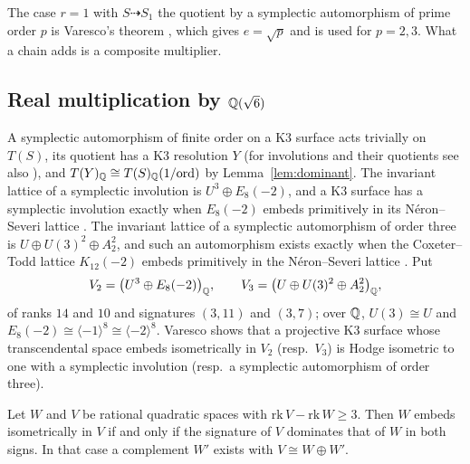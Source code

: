 The case $r=1$ with $S\dashrightarrow S_{1}$ the quotient by a symplectic automorphism of prime order $p$ is Varesco's theorem \cite[Thm.~2.1]{Var23}, which gives $e=\sqrt p$ and is used for $p=2,3$. What a chain adds is a composite multiplier.

\subsection{Real multiplication by \texorpdfstring{$\mathbb{Q}(\sqrt6)$}{Q(sqrt 6)}}

A symplectic automorphism of finite order on a K3 surface acts trivially on $T(S)$, its quotient has a K3 resolution $Y$ \cite{Nik80b} (for involutions and their quotients see also \cite{BN26}), and $T(Y)_{\mathbb{Q}}\cong T(S)_{\mathbb{Q}}(1/\mathrm{ord})$ by Lemma~\ref{lem:dominant}. The invariant lattice of a symplectic involution is $U^{3}\oplus E_{8}(-2)$, and a K3 surface has a symplectic involution exactly when $E_{8}(-2)$ embeds primitively in its N\'eron--Severi lattice \cite{Mor84,vGS07}. The invariant lattice of a symplectic automorphism of order three is $U\oplus U(3)^{2}\oplus A_{2}^{2}$, and such an automorphism exists exactly when the Coxeter--Todd lattice $K_{12}(-2)$ embeds primitively in the N\'eron--Severi lattice \cite[Thm.~4.1]{GS07}. Put
\[
V_{2}=\bigl(U^{3}\oplus E_{8}(-2)\bigr)_{\mathbb{Q}},\qquad V_{3}=\bigl(U\oplus U(3)^{2}\oplus A_{2}^{2}\bigr)_{\mathbb{Q}},
\]
of ranks $14$ and $10$ and signatures $(3,11)$ and $(3,7)$; over $\mathbb{Q}$, $U(3)\cong U$ and $E_{8}(-2)\cong\langle-1\rangle^{8}\cong\langle-2\rangle^{8}$. Varesco \cite[Props.~2.5 and 2.11]{Var23} shows that a projective K3 surface whose transcendental space embeds isometrically in $V_{2}$ (resp.\ $V_{3}$) is Hodge isometric to one with a symplectic involution (resp.\ a symplectic automorphism of order three).

\begin{lemma}\label{lem:embed}
Let $W$ and $V$ be rational quadratic spaces with $\mathrm{rk}\,V-\mathrm{rk}\,W\ge3$. Then $W$ embeds isometrically in $V$ if and only if the signature of $V$ dominates that of $W$ in both signs. In that case a complement $W'$ exists with $V\cong W\oplus W'$.
\end{lemma}


